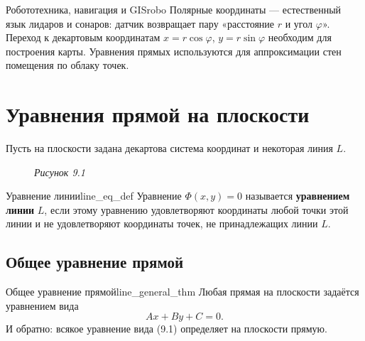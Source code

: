 \documentclass[12pt,a4paper]{article}
\begin{document}
\begin{remarkIT}{Робототехника, навигация и GIS}{robo}
  Полярные координаты — естественный язык лидаров и сонаров: датчик
  возвращает пару «расстояние $r$ и угол $\varphi$». Переход к декартовым
  координатам $x = r\cos\varphi$, $y = r\sin\varphi$ необходим для
  построения карты. Уравнения прямых используются для аппроксимации стен
  помещения по облаку точек.
\end{remarkIT}

\section*{Уравнения прямой на плоскости}

Пусть на плоскости задана декартова система координат и некоторая линия $L$.

\begin{figure}[h!]
  \centering

  \textit{Рисунок 9.1}
\end{figure}

\begin{definition}{Уравнение линии}{line_eq_def}
  Уравнение $\varPhi(x, y) = 0$ называется \textbf{уравнением линии} $L$,
  если этому уравнению удовлетворяют координаты любой точки этой линии и не
  удовлетворяют координаты точек, не принадлежащих линии $L$.
\end{definition}

\subsection*{Общее уравнение прямой}

\begin{theorem}{Общее уравнение прямой}{line_general_thm}
  Любая прямая на плоскости задаётся уравнением вида
  \begin{equation}
    Ax + By + C = 0. \tag{9.1}
  \end{equation}
  И обратно: всякое уравнение вида (9.1) определяет на плоскости прямую.
\end{theorem}
\end{document}
